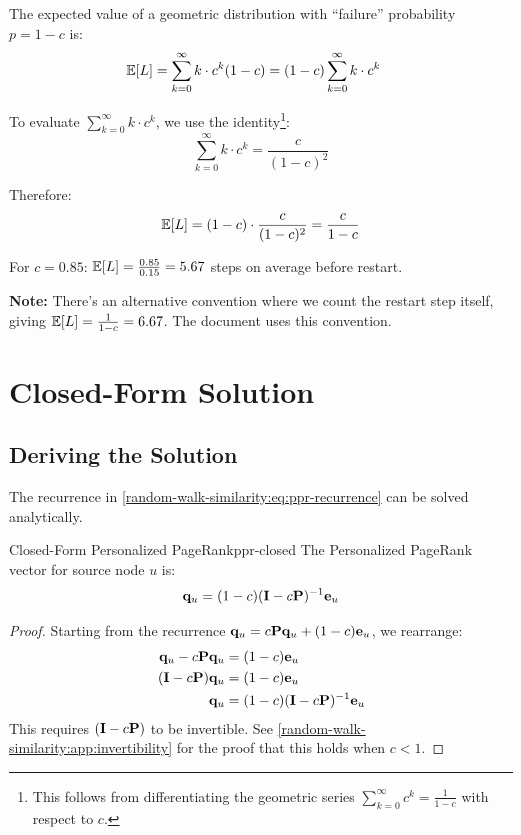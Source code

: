 \begin{notechapter}
\begin{example}
The expected value of a geometric distribution with ``failure'' probability $p = 1-c$ is:
\begin{align}
\mathbb{E}[L] &= \sum_{k=0}^{\infty} k \cdot c^k (1-c) = (1-c) \sum_{k=0}^{\infty} k \cdot c^k
\end{align}

To evaluate $\sum_{k=0}^{\infty} k \cdot c^k$, we use the identity\footnote{This follows from differentiating the geometric series $\sum_{k=0}^{\infty} c^k = \frac{1}{1-c}$ with respect to $c$.}:
\[
\sum_{k=0}^{\infty} k \cdot c^k = \frac{c}{(1-c)^2}
\]

Therefore:
\[
\mathbb{E}[L] = (1-c) \cdot \frac{c}{(1-c)^2} = \frac{c}{1-c}
\]

For $c = 0.85$: $\mathbb{E}[L] = \frac{0.85}{0.15} = 5.67$ steps on average before restart.

\textbf{Note:} There's an alternative convention where we count the restart step itself, giving $\mathbb{E}[L] = \frac{1}{1-c} = 6.67$. The document uses this convention.
\end{example}

\section{Closed-Form Solution}

\subsection{Deriving the Solution}

The recurrence in \cref{random-walk-similarity:eq:ppr-recurrence} can be solved analytically.

\begin{proposition}{Closed-Form Personalized PageRank}{ppr-closed}
The Personalized PageRank vector for source node $u$ is:
\begin{equation}
\mathbf{q}_u = (1 - c)(\mathbf{I} - c\mathbf{P})^{-1} \mathbf{e}_u
\label{random-walk-similarity:eq:ppr-closed}
\end{equation}
\end{proposition}

\begin{proof}
Starting from the recurrence $\mathbf{q}_u = c \mathbf{P} \mathbf{q}_u + (1 - c) \mathbf{e}_u$, we rearrange:
\begin{align}
\mathbf{q}_u - c \mathbf{P} \mathbf{q}_u &= (1 - c) \mathbf{e}_u \\
(\mathbf{I} - c\mathbf{P}) \mathbf{q}_u &= (1 - c) \mathbf{e}_u \\
\mathbf{q}_u &= (1 - c)(\mathbf{I} - c\mathbf{P})^{-1} \mathbf{e}_u
\end{align}
This requires $(\mathbf{I} - c\mathbf{P})$ to be invertible. See \cref{random-walk-similarity:app:invertibility} for the proof that this holds when $c < 1$.
\end{proof}


\end{notechapter}

